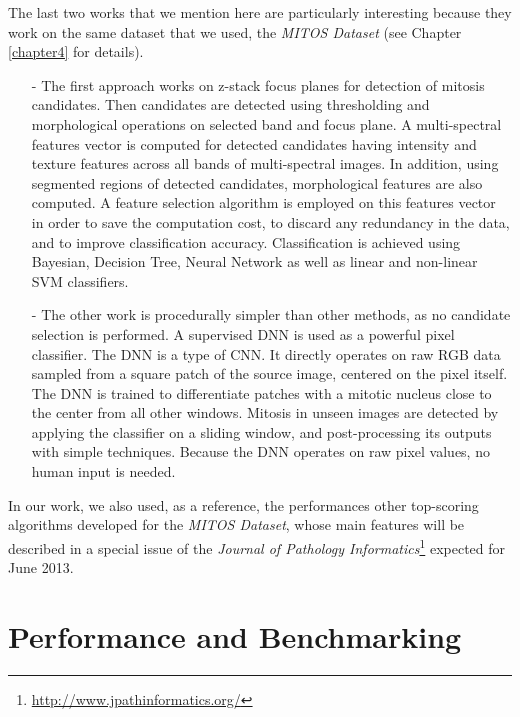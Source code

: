 The last two works that we mention here are particularly interesting because they work on the same dataset that we used, the \textit{MITOS Dataset} (see Chapter \ref{chapter4} for details).

\begin{itemize}
\item[-] The first approach \cite{irshad2013multispectral} works on z-stack focus planes for detection of mitosis candidates.
Then candidates are detected using thresholding and morphological operations on selected band and focus plane.
A multi-spectral features vector is computed for detected candidates having intensity and texture features across all bands
of multi-spectral images. In addition, using segmented regions of detected candidates, morphological features are also computed. A feature selection algorithm
is employed on this features vector in order to save the computation
cost, to discard any redundancy in the data, and to improve classification accuracy.
Classification is achieved using Bayesian, Decision Tree, Neural Network as
well as linear and non-linear \Gls{SVM} classifiers.
 \item[-] The other work \cite{agNN} is procedurally simpler than other methods, as no candidate selection is performed. A supervised \Gls{DNN} is used as a powerful pixel classifier.
The \Gls{DNN} is a type of \Gls{CNN}. It directly operates on raw RGB data sampled from a square patch of the source image, centered on the pixel itself. The \Gls{DNN} is trained to
differentiate patches with a mitotic nucleus close to the center from all other windows.
Mitosis in unseen images are detected by applying the classifier on a sliding window, and post-processing its outputs with simple techniques. Because the \Gls{DNN} operates on
raw pixel values, no human input is needed.
\end{itemize}
 
In our work, we also used, as a reference, the performances other top-scoring algorithms developed for the \textit{MITOS Dataset}, whose main features will be described in
a special issue of the \textit{Journal of Pathology Informatics}\footnote{\url{http://www.jpathinformatics.org/}} expected for June 2013.


\vspace{0.5cm}


\section{Performance and Benchmarking}
\label{ch3:perf}

